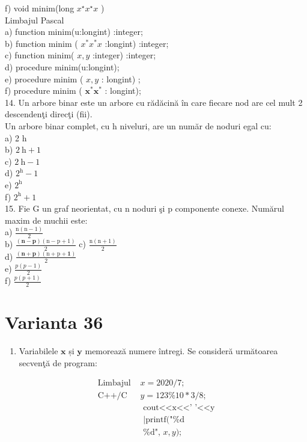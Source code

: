 f) void minim(long $x^{\star} x^{\star} x$ )\\
Limbajul Pascal\\
a) function minim(u:longint) :integer;\\
b) function minim ( $x^{*} x^{*} x$ :longint) :integer;\\
c) function minim( $x, y$ :integer) :integer;\\
d) procedure minim(u:longint);\\
e) procedure minim ( $x, y$ : longint) ;\\
f) procedure minim ( $\mathbf{x}^{*} \mathbf{x}^{*}$ : longint);\\
14. Un arbore binar este un arbore cu rădăcină în care fiecare nod are cel mult 2 descendenţi direcţi (fii).\\
Un arbore binar complet, cu h niveluri, are un număr de noduri egal cu:\\
a) 2 h\\
b) $2 \mathrm{~h}+1$\\
c) $2 \mathrm{~h}-1$\\
d) $2^{\mathrm{h}}-1$\\
e) $2^{\text {h }}$\\
f) $2^{\mathrm{h}}+1$\\
15. Fie G un graf neorientat, cu n noduri şi p componente conexe. Numărul maxim de muchii este:\\
a) $\frac{\mathrm{n}(\mathrm{n}-1)}{2}$\\
b) $\frac{(\mathbf{n}-\mathbf{p})(\mathrm{n}-\mathrm{p}+1)}{2}$ c) $\frac{\mathrm{n}(\mathrm{n}+1)}{2}$\\
d) $\frac{(\mathbf{n}+\mathbf{p})(\mathrm{n}+\mathrm{p}+\mathbf{1})}{2}$\\
e) $\frac{p(p-1)}{2}$\\
f) $\frac{p(p+1)}{2}$

\section*{Varianta 36}
\begin{enumerate}
  \item Variabilele $\mathbf{x}$ și $\mathbf{y}$ memorează numere întregi. Se consideră următoarea secvenţă de program:
\end{enumerate}

$$
\begin{array}{cl}
\text { Limbajul } & x=2020 / 7 ; \\
\text { C++/C } & y=123 \% 10 * 3 / 8 ; \\
& \text { cout<<x<<' '<<y } \\
& \text { |printf("\%d } \\
& \text { \%d", } x, y) ;
\end{array}
$$

